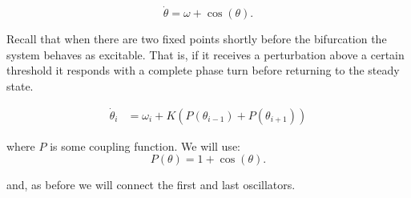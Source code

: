 \documentclass{article}
\begin{document}
\begin{equation} \label{eq_adlers}
    \dot{\theta} = \omega + \cos(\theta).
\end{equation}

Recall that when there are two fixed points shortly before the bifurcation the system behaves as excitable. That is, if it receives a perturbation above a certain threshold it responds with a complete phase turn before returning to the steady state. 


\begin{subequations} \label{eq_Nexcoupled}
\begin{align} 
    \dot{\theta}_i &= \omega_i + K \left(P(\theta_{i-1})+P(\theta_{i+1})\right)  
\end{align}
\end{subequations}

where $P$ is some coupling function. We will use:
\begin{equation} \label{eq_adlers}
    P(\theta) = 1 + \cos(\theta).
\end{equation}

and, as before we will connect the first and last oscillators.





\begin{figure} [h]
    \centerline{}
    \caption{}
    \label{fig_nexccoupled}
\end{figure}
\end{document}
